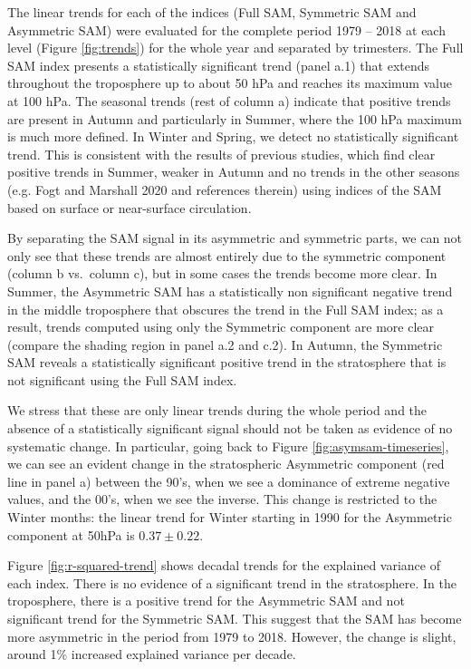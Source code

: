\documentclass[smallextended]{svjour3}       %
\begin{document}
The linear trends for each of the indices (Full SAM, Symmetric SAM and Asymmetric SAM) were evaluated for the complete period 1979 -- 2018 at each level (Figure \ref{fig:trends}) for the whole year and separated by trimesters. The Full SAM index presents a statistically significant trend (panel a.1) that extends throughout the troposphere up to about 50 hPa and reaches its maximum value at 100 hPa. The seasonal trends (rest of column a) indicate that positive trends are present in Autumn and particularly in Summer, where the 100 hPa maximum is much more defined. In Winter and Spring, we detect no statistically significant trend. This is consistent with the results of previous studies, which find clear positive trends in Summer, weaker in Autumn and no trends in the other seasons (e.g. Fogt and Marshall 2020 and references therein) using indices of the SAM based on surface or near-surface circulation.

By separating the SAM signal in its asymmetric and symmetric parts, we can not only see that these trends are almost entirely due to the symmetric component (column b vs.~column c), but in some cases the trends become more clear. In Summer, the Asymmetric SAM has a statistically non significant negative trend in the middle troposphere that obscures the trend in the Full SAM index; as a result, trends computed using only the Symmetric component are more clear (compare the shading region in panel a.2 and c.2). In Autumn, the Symmetric SAM reveals a statistically significant positive trend in the stratosphere that is not significant using the Full SAM index.

We stress that these are only linear trends during the whole period and the absence of a statistically significant signal should not be taken as evidence of no systematic change. In particular, going back to Figure \ref{fig:asymsam-timeseries}, we can see an evident change in the stratospheric Asymmetric component (red line in panel a) between the 90's, when we see a dominance of extreme negative values, and the 00's, when we see the inverse. This change is restricted to the Winter months: the linear trend for Winter starting in 1990 for the Asymmetric component at 50hPa is \(0.37 \pm 0.22\).

Figure \ref{fig:r-squared-trend} shows decadal trends for the explained variance of each index. There is no evidence of a significant trend in the stratosphere. In the troposphere, there is a positive trend for the Asymmetric SAM and not significant trend for the Symmetric SAM. This suggest that the SAM has become more asymmetric in the period from 1979 to 2018. However, the change is slight, around 1\% increased explained variance per decade.
\end{document}
